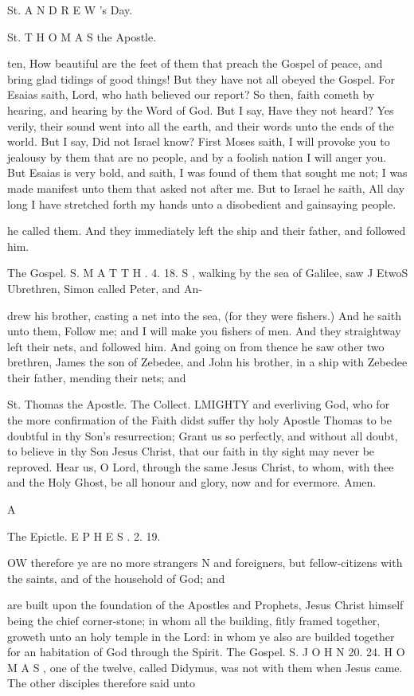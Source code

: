 St. A N D R E W ’s Day.

St. T H O M A S the Apostle.

ten, How beautiful are the feet of them that preach the Gospel of peace, and bring glad tidings of good things! But they have not all obeyed the Gospel. For Esaias saith, Lord, who hath believed our report? So then, faith cometh by hearing, and hearing by the Word of God. But I say, Have they not heard? Yes verily, their sound went into all the earth, and their words unto the ends of the world. But I say, Did not Israel know? First Moses saith, I will provoke you to jealousy by them that are no people, and by a foolish nation I will anger you. But Esaias is very bold, and saith, I was found of them that sought me not; I was made manifest unto them that asked not after me. But to Israel he saith, All day long I have stretched forth my hands unto a disobedient and gainsaying people.

he called them. And they immediately left the ship and their father, and followed him.

The Gospel. S. M A T T H . 4. 18. S , walking by the sea of Galilee, saw J EtwoS Ubrethren, Simon called Peter, and An-

drew his brother, casting a net into the sea, (for they were fishers.) And he saith unto them, Follow me; and I will make you fishers of men. And they straightway left their nets, and followed him. And going on from thence he saw other two brethren, James the son of Zebedee, and John his brother, in a ship with Zebedee their father, mending their nets; and

St. Thomas the Apostle. The Collect. LMIGHTY and everliving God, who for the more confirmation of the Faith didst suffer thy holy Apostle Thomas to be doubtful in thy Son’s resurrection; Grant us so perfectly, and without all doubt, to believe in thy Son Jesus Christ, that our faith in thy sight may never be reproved. Hear us, O Lord, through the same Jesus Christ, to whom, with thee and the Holy Ghost, be all honour and glory, now and for evermore. Amen.

A

The Epictle. E P H E S . 2. 19.

OW therefore ye are no more strangers N and foreigners, but fellow-citizens with the saints, and of the household of God; and

are built upon the foundation of the Apostles and Prophets, Jesus Christ himself being the chief corner-stone; in whom all the building, fitly framed together, groweth unto an holy temple in the Lord: in whom ye also are builded together for an habitation of God through the Spirit. The Gospel. S. J O H N 20. 24. H O M A S , one of the twelve, called Didymus, was not with them when Jesus came. The other disciples therefore said unto

